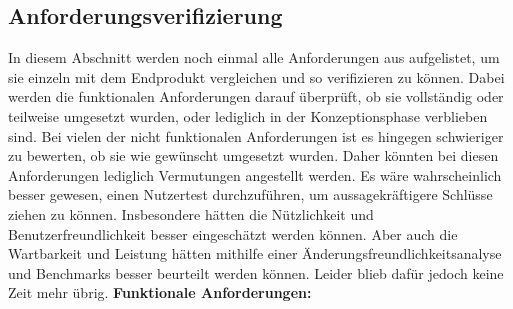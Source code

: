 \subsection{Anforderungsverifizierung}%
%
In diesem Abschnitt werden noch einmal alle Anforderungen aus  aufgelistet, um sie einzeln mit dem Endprodukt vergleichen und so verifizieren zu können. %
Dabei werden die funktionalen Anforderungen darauf überprüft, ob sie vollständig oder teilweise umgesetzt wurden, oder lediglich in der Konzeptionsphase verblieben sind. %
Bei vielen der nicht funktionalen Anforderungen ist es hingegen schwieriger zu bewerten, ob sie wie gewünscht umgesetzt wurden. Daher könnten bei diesen Anforderungen lediglich Vermutungen angestellt werden. %
	Es wäre wahrscheinlich besser gewesen, einen Nutzertest durchzuführen, um aussagekräftigere Schlüsse ziehen zu können. Insbesondere hätten die Nützlichkeit und Benutzerfreundlichkeit besser eingeschätzt werden können. Aber auch die Wartbarkeit und Leistung hätten mithilfe einer Änderungsfreundlichkeitsanalyse und Benchmarks besser beurteilt werden können. Leider blieb dafür jedoch keine Zeit mehr übrig.%
\newline%
\myNewSection%
\textbf{Funktionale Anforderungen:}%
